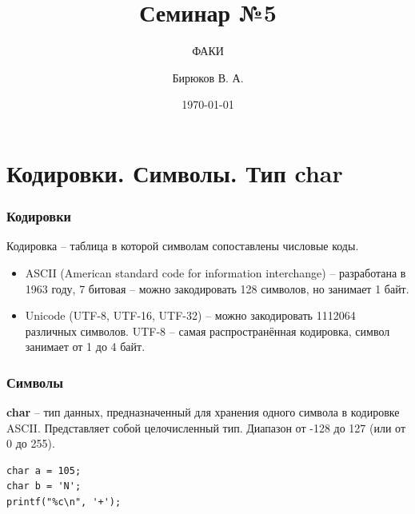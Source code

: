 \documentclass[12pt,pdf,hyperref={unicode}]{beamer}
\title{Семинар №5}
\subtitle{ФАКИ \the\year}
\author{Бирюков В. А.}
\date{\today}
\begin{document}
\lstset{language=C}

\begin{frame}
\titlepage
\end{frame} 



\section{Кодировки. Символы. Тип char}

\begin{frame}[fragile]
\frametitle{Кодировки} 
Кодировка -- таблица в которой символам сопоставлены числовые коды.
\begin{itemize}
\item ASCII (American standard code for information interchange) -- разработана в 1963 году, 7 битовая -- можно закодировать 128 символов, но занимает 1 байт.
\item Unicode (UTF-8, UTF-16, UTF-32) -- можно закодировать 1112064 различных символов. UTF-8 -- самая распространённая кодировка, символ занимает от 1 до 4 байт.
\end{itemize}
\end{frame}


\begin{frame}[fragile]
\frametitle{Символы} 
\textbf{char} -- тип данных, предназначенный для хранения одного символа в кодировке ASCII. Представляет собой целочисленный тип. Диапазон от -128 до 127 (или от 0 до 255).
\begin{lstlisting}
char a = 105;
char b = 'N';
printf("%c\n", '+');
\end{lstlisting}
\end{frame}
\end{document}
